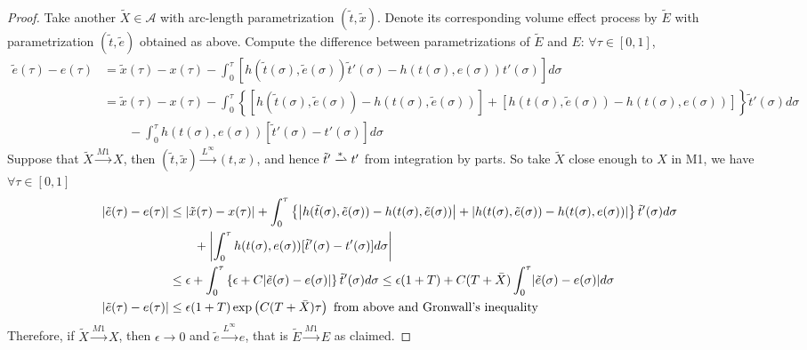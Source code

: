 \documentclass[openany,oneside]{article}
\theoremstyle{definition}
\theoremstyle{remark}
\DeclarePairedDelimiter{\abs}{\lvert}{\rvert} %
\begin{document}
\begin{proof}
Take another $\tilde{X}\in \mathcal{A}$ with arc-length parametrization $(\tilde{t},\tilde{x})$. Denote its corresponding volume effect process by $\tilde{E}$ with parametrization $(\tilde{t},\tilde{e})$ obtained as above. Compute the difference between parametrizations of $\tilde{E}$ and $E$: $\forall \tau\in[0,1]$,
\begin{align*}
\tilde{e}(\tau) - e(\tau) &= \tilde{x}(\tau) - x(\tau) - \int_0^\tau \left[h(\tilde{t}(\sigma),\tilde{e}(\sigma)) \tilde{t}'(\sigma) - h(t(\sigma),e(\sigma)) t'(\sigma) \right] d\sigma \\
&= \tilde{x}(\tau) - x(\tau) - \int_0^\tau \left\{ [h(\tilde{t}(\sigma),\tilde{e}(\sigma)) - h(t(\sigma),\tilde{e}(\sigma))] + [h(t(\sigma),\tilde{e}(\sigma)) - h(t(\sigma),e(\sigma))] \right\} \tilde{t}'(\sigma) d\sigma \\
&\qquad - \int_0^\tau h(t(\sigma),e(\sigma)) [\tilde{t}'(\sigma) - t'(\sigma)] d\sigma
\end{align*}
Suppose that $\tilde{X} \xrightarrow{M1} X$, then $(\tilde{t},\tilde{x}) \xrightarrow{L^\infty} (t,x)$, and hence $\tilde{t}' \xrightharpoonup{\ast} t'$ from integration by parts. So take $\tilde{X}$ close enough to $X$ in M1, we have $\forall \tau\in[0,1]$
\begin{align*}
\abs{\tilde{e}(\tau) - e(\tau)} &\le \abs{\tilde{x}(\tau) - x(\tau)} + \int_0^\tau \left\{ \left|h(\tilde{t}(\sigma),\tilde{e}(\sigma)) - h(t(\sigma),\tilde{e}(\sigma))\right| + \left|h(t(\sigma),\tilde{e}(\sigma)) - h(t(\sigma),e(\sigma))\right| \right\} \tilde{t}'(\sigma) d\sigma \\
&\qquad + \left| \int_0^\tau h(t(\sigma),e(\sigma)) [\tilde{t}'(\sigma) - t'(\sigma)] d\sigma \right| \\
&\le \epsilon + \int_0^\tau \left\{\epsilon+C\abs{\tilde{e}(\sigma) - e(\sigma)} \right\} \tilde{t}'(\sigma) d\sigma
\le \epsilon(1+T) + C(T+\bar{X}) \int_0^\tau \abs{\tilde{e}(\sigma)-e(\sigma)} d\sigma \\
\abs{\tilde{e}(\tau) - e(\tau)} &\le \epsilon(1+T) \exp\left(C(T+\bar{X})\tau\right) \textrm{ from above and Gronwall's inequality}
\end{align*}
Therefore, if $\tilde{X} \xrightarrow{M1} X$, then $\epsilon \to 0$ and $\tilde{e} \xrightarrow{L^\infty} e$, that is $\tilde{E} \xrightarrow{M1} E$ as claimed.


\end{proof}
\end{document}
